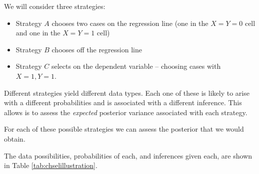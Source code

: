 \documentclass[12pt,]{book}
\providecommand{\tightlist}{%
  \setlength{\itemsep}{0pt}\setlength{\parskip}{0pt}}
\begin{document}
We will consider three strategies:

\begin{itemize}
\tightlist
\item
  Strategy \(A\) chooses two cases on the regression line (one in the \(X=Y=0\) cell and one in the \(X=Y=1\) cell)
\item
  Strategy \(B\) chooses off the regression line
\item
  Strategy \(C\) selects on the dependent variable -- choosing cases with \(X=1, Y = 1\).
\end{itemize}

Different strategies yield different data types. Each one of these is likely to arise with a different probabilities and is associated with a different inference. This allows is to assess the \emph{expected} posterior variance associated with each strategy.

For each of these possible strategies we can assess the posterior that we would obtain.

The data possibilities, probabilities of each, and inferences given each, are shown in Table \ref{tab:chselillustration}.
\end{document}
